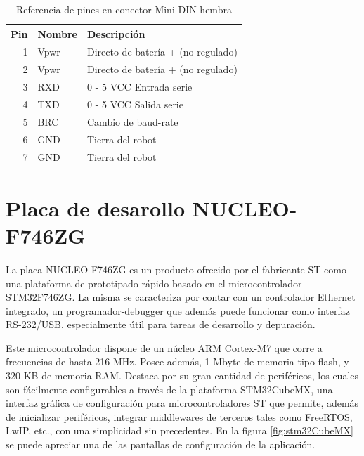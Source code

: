 \begin{table}[h]
    \centering
    \caption{Referencia de pines en conector Mini-DIN hembra}
    \label{tab:Pines}
    \begin{tabular}{rll}
        \toprule
        \multicolumn{1}{l}{Pin} & Nombre & Descripción                        \\
        \midrule
        1                       & Vpwr   & Directo de batería + (no regulado) \\
        2                       & Vpwr   & Directo de batería + (no regulado) \\
        3                       & RXD    & 0 - 5 VCC Entrada serie            \\
        4                       & TXD    & 0 - 5 VCC Salida serie             \\
        5                       & BRC    & Cambio de baud-rate                \\
        6                       & GND    & Tierra del robot                   \\
        7                       & GND    & Tierra del robot                   \\
        \bottomrule
    \end{tabular}
\end{table}
\section{Placa de desarollo NUCLEO-F746ZG}

La placa NUCLEO-F746ZG es un producto ofrecido por el fabricante ST como una plataforma de prototipado rápido basado en el microcontrolador STM32F746ZG. La misma se caracteriza por contar con un controlador Ethernet integrado, un programador-debugger que además puede funcionar como interfaz RS-232/USB, especialmente útil para tareas de desarrollo y depuración.

Este microcontrolador dispone de un núcleo ARM Cortex-M7 que corre a frecuencias de hasta 216 MHz. Posee además, 1 Mbyte de memoria tipo flash, y 320 KB de memoria RAM. Destaca por su gran cantidad de periféricos, los cuales son fácilmente configurables a través de la plataforma STM32CubeMX, una interfaz gráfica de configuración para microcontroladores ST que permite, además de inicializar periféricos, integrar middlewares de terceros tales como FreeRTOS, LwIP, etc., con una simplicidad sin precedentes. En la figura \ref{fig:stm32CubeMX} se puede apreciar una de las pantallas de configuración de la aplicación.


